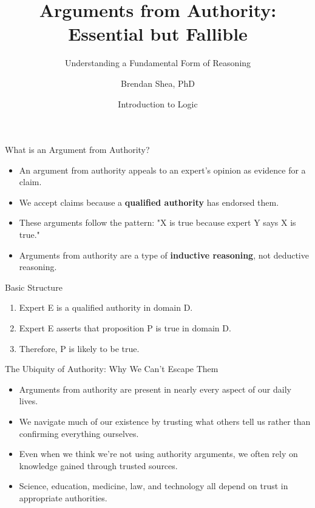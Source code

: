 \documentclass{beamer}
\title{Arguments from Authority: Essential but Fallible}
\subtitle{Understanding a Fundamental Form of Reasoning}
\author{Brendan Shea, PhD}
\date{Introduction to Logic}
\begin{document}
\begin{frame}
    \titlepage
\end{frame}

\begin{frame}{What is an Argument from Authority?}
    \begin{itemize}
        \item An argument from authority appeals to an expert's opinion as evidence for a claim.
        \item We accept claims because a \textbf{qualified authority} has endorsed them.
        \item These arguments follow the pattern: "X is true because expert Y says X is true."
        \item Arguments from authority are a type of \textbf{inductive reasoning}, not deductive reasoning.
    \end{itemize}
    
    \begin{block}{Basic Structure}
        \begin{enumerate}
            \item Expert E is a qualified authority in domain D.
            \item Expert E asserts that proposition P is true in domain D.
            \item Therefore, P is likely to be true.
        \end{enumerate}
    \end{block}
\end{frame}

\begin{frame}{The Ubiquity of Authority: Why We Can't Escape Them}
    \begin{itemize}
        \item Arguments from authority are present in nearly every aspect of our daily lives.
        \item We navigate much of our existence by trusting what others tell us rather than confirming everything ourselves.
        \item Even when we think we're not using authority arguments, we often rely on knowledge gained through trusted sources.
        \item Science, education, medicine, law, and technology all depend on trust in appropriate authorities.
    \end{itemize}
    
\end{frame}
\end{document}
